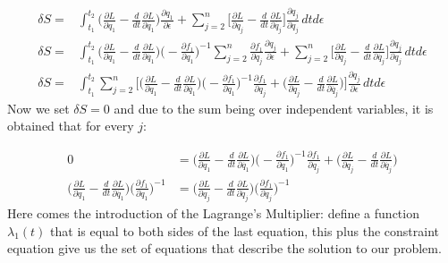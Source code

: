 \documentclass{article}
\begin{document}
\begin{equation*}
    \begin{split}
        \delta S =& \int_{t_1}^{t_2} \bigg(\frac{\partial L}{\partial {q_1}} -\frac{d}{dt}\frac{\partial L}{\partial \dot{q_1}} \bigg) \frac{\partial q_1}{\partial \epsilon} + \sum_{j=2}^{n} \bigg[\frac{\partial L}{\partial {q_j}} -\frac{d}{dt}\frac{\partial L}{\partial \dot{q_j}}\bigg]\frac{\partial q_j}{\partial q_j}  \,dtd\epsilon\\
        \delta S =& \int_{t_1}^{t_2} \bigg(\frac{\partial L}{\partial {q_1}} -\frac{d}{dt}\frac{\partial L}{\partial \dot{q_1}} \bigg) \bigg(-\frac{\partial f_1}{\partial q_1}  \bigg)^{-1}  \sum_{j=2}^{n} \frac{\partial f_1}{\partial q_j} \frac{\partial q_j}{\partial\epsilon} + \sum_{j=2}^{n} \bigg[\frac{\partial L}{\partial {q_j}} -\frac{d}{dt}\frac{\partial L}{\partial \dot{q_j}}\bigg]\frac{\partial q_j}{\partial q_j}  \,dtd\epsilon\\
        \delta S =& \int_{t_1}^{t_2} \sum_{j=2}^{n} \bigg[ \bigg(\frac{\partial L}{\partial {q_1}} -\frac{d}{dt}\frac{\partial L}{\partial \dot{q_1}} \bigg) \bigg(-\frac{\partial f_1}{\partial q_1}  \bigg)^{-1}\frac{\partial f_1}{\partial q_j} + \bigg( \frac{\partial L}{\partial {q_j}} -\frac{d}{dt}\frac{\partial L}{\partial \dot{q_j}}   \bigg)\bigg] \frac{\partial q_j}{\partial \epsilon} \,dtd\epsilon
  \end{split}
\end{equation*}
Now we set $\delta S=0$ and due to the sum being over independent variables, it is obtained that for every $j$:

\begin{equation*}
    \begin{split}
        0&=\bigg(\frac{\partial L}{\partial {q_1}} -\frac{d}{dt}\frac{\partial L}{\partial \dot{q_1}} \bigg) \bigg(-\frac{\partial f_1}{\partial q_1}  \bigg)^{-1}\frac{\partial f_1}{\partial q_j} + \bigg( \frac{\partial L}{\partial {q_j}} -\frac{d}{dt}\frac{\partial L}{\partial \dot{q_j}}   \bigg)\\
        \bigg(\frac{\partial L}{\partial {q_1}} -\frac{d}{dt}\frac{\partial L}{\partial \dot{q_1}} \bigg) \bigg(\frac{\partial f_1}{\partial q_1}  \bigg)^{-1} &= \bigg( \frac{\partial L}{\partial {q_j}} -\frac{d}{dt}\frac{\partial L}{\partial \dot{q_j}} \bigg)\bigg(\frac{\partial f_1}{\partial q_j}  \bigg)^{-1}
    \end{split}
\end{equation*}
Here comes the introduction of the Lagrange's Multiplier: define a function $\lambda_1(t)$ that is equal to both sides of the last equation, this plus the constraint equation give us the set of equations that describe the solution to our problem.
\end{document}
